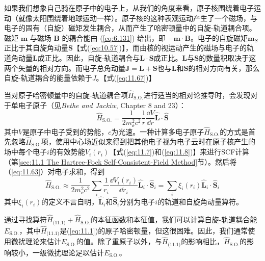     如果我们想象自己骑在原子中的电子上，从我们的角度来看，原子核围绕着电子运动（就像太阳围绕着地球运动一样）。原子核的这种表观运动产生了一个磁场，与电子的固有（自旋）磁矩发生耦合，从而产生了哈密顿量中的自旋-轨道耦合项。磁矩 $\mathbf{m}$ 与磁场 $\mathbf{B}$ 的耦合能由 (\ref{eq:6.131}) 给出，即 $-\mathbf{m}\cdot\mathbf{B}$。电子的自旋磁矩$\mathbf{m}_S$正比于其自旋角动量$\mathbf{S}$【式(\ref{eq:10.57})】，而由核的视运动产生的磁场与电子的轨道角动量$\mathbf{L}$成正比。因此，自旋-轨道耦合与$\mathbf{L}\cdot\mathbf{S}$成正比。$\mathbf{L}$与$\mathbf{S}$的数量积取决于这两个矢量的相对方向。而电子总角动量$\mathbf{J}=\mathbf{L}+\mathbf{S}$也与$\mathbf{L}$和$\mathbf{S}$的相对方向有关，那么自旋-轨道耦合的能量依赖于$J$。【式(\ref{eq:11.67})】

    当对原子哈密顿量中的自旋-轨道耦合项$\hat{H}_{\text{S.O.}}$进行适当的相对论推导时，会发现对于单电子原子（见\textit{Bethe and Jackiw}, Chapter 8 and 23）：
    \begin{equation}
        \hat{H}_{\text{S.O.}} = \frac{1}{2m_{\ee }^2 c^2} \frac{1}{r} \frac{\dd V}{\dd r} \hat{\mathbf{L}} \cdot \hat{\mathbf{S}}
        \label{eq:11.63}
    \end{equation}
    其中$V$是原子中电子受到的势能，$c$为光速。一种计算多电子原子$\hat{H}_{\text{S.O.}}$的方式是首先忽略$\hat{H}_{\text{S.O.}}$项，使用中心场近似来得到把其他电子视为电子云时在原子核产生的场中每个电子$i$的有效势能$V_i\left(r_i\right)$【式(\ref{eq:11.7})和(\ref{eq:11.8})】来进行SCF计算（第\ref{sec:11.1 The Hartree-Fock Self-Consistent-Field Method}节）。然后将（\ref{eq:11.63}）对电子求和，得到
    \begin{equation}
        \hat{H}_{\text{S.O.}} \approx \frac{1}{2m_{\ee }^2c^2} \sum_i \frac{1}{r_i} \frac{\dd V_i(r_i)}{\dd r_i} \hat{\mathbf{L}}_i \cdot \hat{\mathbf{S}}_i = \sum_i \xi_i(r_i) \hat{\mathbf{L}}_i \cdot \hat{\mathbf{S}}_i
        \label{eq:11.64}
    \end{equation}
    其中$\xi_i\left(r_i\right)$的定义不言自明，$\hat{\mathbf{L}}_i$和$\hat{\mathbf{S}}_i$分别为电子$i$的轨道和自旋角动量算符。


    通过寻找算符$\hat{H}_{\text{(11.1)}}+\hat{H}_{\text{S.O.}}$的本征函数和本征值，我们可以计算自旋-轨道耦合能$E_{\text{S.O.}}$，其中$\hat{H}_{\text{(11.1)}}$是(\ref{eq:11.1})的原子哈密顿量，但这很困难。因此，我们通常使用微扰理论来估计$E_{\text{S.O.}}$的值。除了重原子以外，与$\hat{H}_{\text{(11.1)}}$的影响相比，$\hat{H}_{\text{S.O.}}$的影响较小，一级微扰理论足以估计$E_{\text{S.O.}}$。

